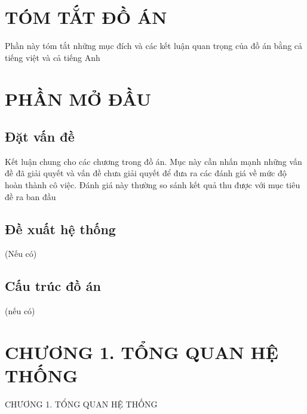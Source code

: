\documentclass{article}%
\renewcommand{\tablename}{\fontsize{12pt}{0pt}\selectfont \bfseries Bảng} %
\begin{document}
{
\let\oldnumberline\numberline
\renewcommand{\numberline}{\tablename~\oldnumberline}%
\listoftables
} %
\cleardoublepage

\section*{TÓM TẮT ĐỒ ÁN}
Phần này tóm tắt những mục đích và các kết luận quan trọng của đồ án bằng cả tiếng việt và cả tiếng Anh
\cleardoublepage

\section*{PHẦN MỞ ĐẦU}
\subsection*{Đặt vấn đề}
Kết luận chung cho các chương trong đồ án. Mục này cần nhấn mạnh những vấn đề đã giải
quyết và vấn đề chưa giải quyết để đưa ra các đánh giá về mức độ hoàn thành cô việc. Đánh 
giá này thường so sánh kết quả thu được với mục tiêu đề ra ban đầu 

\subsection*{Đề xuất hệ thống}
(Nếu có) \cite{nhu2019effects}

\subsection*{Cấu trúc đồ án}
(nếu có)
\cleardoublepage


\section*{CHƯƠNG 1. TỔNG QUAN HỆ THỐNG }
\setcounter{section}{1}
\setcounter{subsection}{0} %
\setcounter{table}{0} %
\setcounter{figure}{0} %
{\numberline{}CHƯƠNG 1. TỔNG QUAN HỆ THỐNG}
\end{document}

